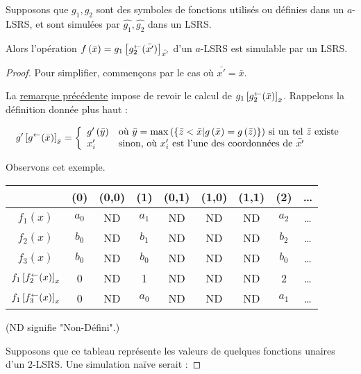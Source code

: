 	\begin{lemma}
		Supposons que $g_1, g_2$ sont des symboles de fonctions utilisés ou définies dans un $a$-LSRS, et sont simulées par $\hat{g_1},\hat{g_2}$ dans un LSRS.
		
		Alors l'opération $f\left(\bar{x}\right) = g_1\left[ g_2^{\leftarrow}(\bar{x'}) \right]_{\bar{x'}}$ d'un $a$-LSRS est simulable par un LSRS.
	\end{lemma}
	
	\begin{proof}		
		Pour simplifier, commençons par le cas où $\bar{x'} = \bar{x}$. 
		
		La \hyperref[rk:fonctions_en_attente]{remarque précédente} impose de revoir le calcul de $g_1\left[ g_2^{\leftarrow}(\bar{x}) \right]_{\bar{x}}$. Rappelons la définition donnée plus haut : 
		
		\[
			g'\left[ g^{\leftarrow}(\bar{x}) \right]_{\bar{x}} = \left\lbrace \begin{array}{ll} 
				g'\left( \bar{y} \right) & \text{où $\bar{y} = \max\left( \left\lbrace \bar{z} < \bar{x} | g\left( \bar{x} \right) = g\left( \bar{z} \right) \right\rbrace \right)$ si un tel $\bar{z}$ existe} \\
				x'_i & \text{sinon, où $x'_i$ est l'une des coordonnées de $\bar{x'}$}
			 \end{array} \right.
		\]
		
		Observons cet exemple.
		
		\espace 
		\begin{center}
			\begin{tabular}{|c|cccccccc|}
				\hline
									& (0)	& (0,0)	& (1)	& (0,1)	& (1,0)	& (1,1)	& (2)	& \dots \\
				\hline
				$f_1(x)$ 			& $a_0$	& ND	& $a_1$	& ND	& ND	& ND	& $a_2$	& \dots \\
				$f_2(x)$ 			& $b_0$	& ND	& $b_1$	& ND	& ND	& ND	& $b_2$	& \dots \\
				$f_3(x)$	 		& $b_0$	& ND	& $b_0$	& ND	& ND	& ND	& $b_0$	& \dots \\
				$f_1\left[ f_2^{\leftarrow}(x) \right]_{x}$
									& 0		& ND	& 1		& ND	& ND	& ND	& 2		& \dots \\
				$f_1\left[ f_3^{\leftarrow}(x) \right]_{x}$
									& 0		& ND	& $a_0$	& ND	& ND	& ND	& $a_1$	& \dots \\
				\hline 
				
			\end{tabular}
		\end{center}

			
		\espace 
		(ND signifie "Non-Défini".)
			
		Supposons que ce tableau représente les valeurs de quelques fonctions unaires d'un $2$-LSRS. Une simulation naïve serait :
		

\end{proof}
